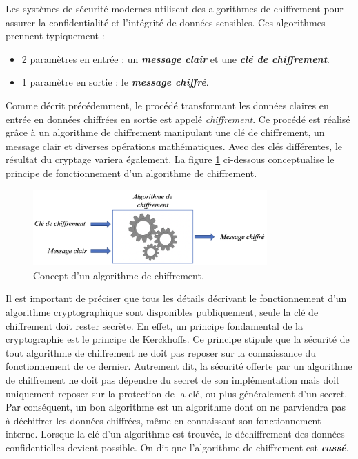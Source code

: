 \documentclass[oneside]{book}
\begin{document}
\hspace{-0.5cm}Les systèmes de sécurité modernes utilisent des algorithmes de chiffrement pour assurer la confidentialité et l'intégrité de données sensibles. Ces algorithmes prennent typiquement : 
\begin{itemize}
\item  2 paramètres en entrée : un \textbf{\textit{message clair}} et une \textbf{\textit{clé de chiffrement}}.
\item 1 paramètre en sortie : le \textbf{\textit{message chiffré}}. \\
\end{itemize}
Comme décrit précédemment, le procédé transformant les données claires en entrée en données chiffrées en sortie est appelé \textit{chiffrement}. Ce procédé est réalisé grâce à un algorithme de chiffrement manipulant une clé de chiffrement, un message clair et diverses opérations mathématiques. Avec des clés différentes, le résultat du cryptage variera également. La figure \ref{fig:chiffrement} ci-dessous conceptualise le principe de fonctionnement d'un algorithme de chiffrement.

\begin{figure}[htbp]
    \centering
    \includegraphics[width=0.8\textwidth]{image/chiffrement}
    \caption{Concept d'un algorithme de chiffrement.}
    \label{fig:chiffrement}
\end{figure}

Il est important de préciser que tous les détails décrivant le fonctionnement d'un algorithme cryptographique sont disponibles publiquement, seule la clé de chiffrement doit rester secrète. En effet, un principe fondamental de la cryptographie est le principe de Kerckhoffs. Ce principe stipule que la sécurité de tout algorithme de chiffrement ne doit pas reposer sur la connaissance du fonctionnement de ce dernier. Autrement dit, la sécurité offerte par un algorithme de chiffrement ne doit pas dépendre du secret de son implémentation mais doit uniquement reposer sur la protection de la clé, ou plus généralement d'un secret. Par conséquent, un bon algorithme est un algorithme dont on ne parviendra pas à déchiffrer les données chiffrées, même en connaissant son fonctionnement interne. Lorsque la clé d'un algorithme est trouvée, le déchiffrement des données confidentielles devient possible. On dit que l'algorithme de chiffrement est \textbf{\textit{cassé}}.
\end{document}
